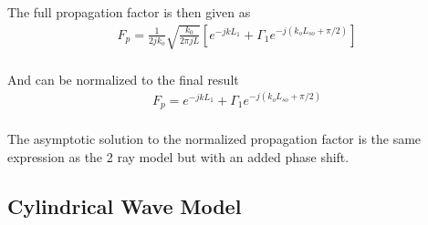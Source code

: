 The full propagation factor is then given as
\begin{equation}
\begin{gathered}
F_p= \frac{1}{2jk_o}\sqrt{\frac{k_0}{2\pi jL}}\left[e^{-jkL_1} + \Gamma_1e^{-j\left(k_oL_{so}+\pi/2\right)}\right] \\
\end{gathered}
\label{mp_eq:27}
\end{equation}

And can be normalized to the final result
\begin{equation}
\begin{gathered}
\boxed{F_p= e^{-jkL_1} + \Gamma_1e^{-j\left(k_oL_{so}+\pi/2\right)}} \\
\end{gathered}
\label{mp_eq:28}
\end{equation}

The asymptotic solution to the normalized propagation factor is the same expression as the 2 ray model but with an added phase shift.

\subsection{Cylindrical Wave Model}